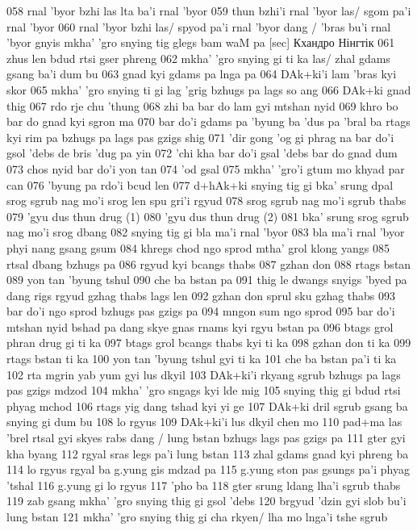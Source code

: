 \documentclass{article}
\begin{document}
058 rnal 'byor bzhi las lta ba'i rnal 'byor
059 thun bzhi'i rnal 'byor las/ sgom pa'i rnal 'byor
060 rnal 'byor bzhi las/ spyod pa'i rnal 'byor dang / 'bras bu'i rnal 'byor gnyis
mkha' 'gro snying tig glegs bam waM pa [sec] Кхандро Нінгтік
061 zhus len bdud rtsi gser phreng
062 mkha' 'gro snying gi ti ka las/ zhal gdams gsang ba'i dum bu
063 gnad kyi gdams pa lnga pa
064 DAk+ki'i lam 'bras kyi skor
065 mkha' 'gro snying ti gi lag 'grig bzhugs pa lags so ang
066 DAk+ki gnad thig
067 rdo rje chu 'thung
068 zhi ba bar do lam gyi mtshan nyid
069 khro bo bar do gnad kyi sgron ma
070 bar do'i gdams pa 'byung ba 'dus pa 'bral ba rtags kyi rim pa bzhugs pa lags pas gzigs shig
071 'dir gong 'og gi phrag na bar do'i gsol 'debs de bris 'dug pa yin
072 'chi kha bar do'i gsal 'debs bar do gnad dum
073 chos nyid bar do'i yon tan
074 'od gsal
075 mkha' 'gro'i gtum mo khyad par can
076 'byung pa rdo'i bcud len
077 d+hAk+ki snying tig gi bka' srung dpal srog sgrub nag mo'i srog len spu gri'i rgyud
078 srog sgrub nag mo'i sgrub thabs
079 'gyu dus thun drug (1)
080 'gyu dus thun drug (2)
081 bka' srung srog sgrub nag mo'i srog dbang
082 snying tig gi bla ma'i rnal 'byor
083 bla ma'i rnal 'byor phyi nang gsang gsum
084 khregs chod ngo sprod mtha' grol klong yangs
085 rtsal dbang bzhugs pa
086 rgyud kyi bcangs thabs
087 gzhan don
088 rtags bstan
089 yon tan 'byung tshul
090 che ba bstan pa
091 thig le dwangs snyigs 'byed pa dang rigs rgyud gzhag thabs lags len
092 gzhan don sprul sku gzhag thabs
093 bar do'i ngo sprod bzhugs pas gzigs pa
094 mngon sum ngo sprod
095 bar do'i mtshan nyid bshad pa dang skye gnas rnams kyi rgyu bstan pa
096 btags grol phran drug gi ti ka
097 btags grol bcangs thabs kyi ti ka
098 gzhan don ti ka
099 rtags bstan ti ka
100 yon tan 'byung tshul gyi ti ka
101 che ba bstan pa'i ti ka
102 rta mgrin yab yum gyi lus dkyil
103 DAk+ki'i rkyang sgrub bzhugs pa lags pas gzigs mdzod
104 mkha' 'gro sngags kyi lde mig
105 snying thig gi bdud rtsi phyag mchod
106 rtags yig dang tshad kyi yi ge
107 DAk+ki dril sgrub gsang ba snying gi dum bu
108 lo rgyus
109 DAk+ki'i lus dkyil chen mo
110 pad+ma las 'brel rtsal gyi skyes rabs dang / lung bstan bzhugs lags pas gzigs pa
111 gter gyi kha byang
112 rgyal sras legs pa'i lung bstan
113 zhal gdams gnad kyi phreng ba
114 lo rgyus rgyal ba g.yung gis mdzad pa
115 g.yung ston pas gsungs pa'i phyag 'tshal
116 g.yung gi lo rgyus
117 'pho ba
118 gter srung ldang lha'i sgrub thabs
119 zab gsang mkha' 'gro snying thig gi gsol 'debs
120 brgyud 'dzin gyi slob bu'i lung bstan
121 mkha' 'gro snying thig gi cha rkyen/ lha mo lnga'i tshe sgrub
\end{document}
